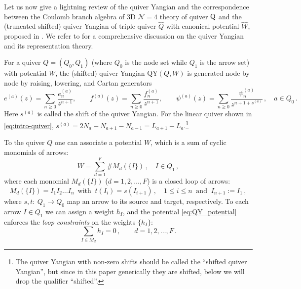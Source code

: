 \documentclass[12pt,a4paper]{article}
\begin{document}
Let us now give a lightning review of the quiver Yangian  and the correspondence between the Coulomb branch algebra of 3D $\mathcal N=4$ theory of quiver $\rm Q$ and the (truncated shifted) quiver Yangian of triple quiver $\hat Q$ with canonical potential $\hat W$, proposed in \cite{ChenLi2026}. We refer to \cite{LiYamazaki2020,Li2024} for a comprehensive discussion on the quiver Yangian and its representation theory.

For a quiver $Q=(Q_0,Q_1)$ (where $Q_0$ is the node set while $Q_1$ is the arrow set) with potential $W$, the (shifted) quiver Yangian QY$(Q,W)$ is generated node by node by
raising, lowering, and Cartan generators
\begin{equation}
 e^{(a)}(z)=\sum_{n\geq0}\frac{e_n^{(a)}}{z^{n+1}},
 \qquad
 f^{(a)}(z)=\sum_{n\geq0}\frac{f_n^{(a)}}{z^{n+1}},
 \qquad
 \psi^{(a)}(z)=\sum_{n\geq 0}\frac{\psi_n^{(a)}}{z^{n+1+s^{(a)}}}\,,\quad a\in Q_0\,.
 \label{eq:qy-mode-expansion}
\end{equation}
Here $s^{(a)}$ is called the shift of the quiver Yangian. For the linear quiver shown in \eqref{eq:intro-quiver}, $s^{(a)}=2N_{a}-N_{a+1}-N_{a-1}=L_{a+1}-L_a$.\footnote{The quiver Yangian with non-zero shifts should be called the ``shifted quiver Yangian”, but since
in this paper generically they are shifted, below we will drop the qualifier ``shifted”.}

To the quiver $Q$ one can associate a potential $W$, which is a sum of cyclic monomials of arrows: 
\begin{equation}\label{eq:QY_potential}
	W=\sum_{d=1}^{F}\# M_d(\{I\})\,,\quad I\in Q_1\,,
\end{equation}
where each monomial $M_d(\{I\})$ ($d=1,2,\dots,F$) is a closed loop of arrows:
\begin{equation}
	M_d(\{I\})=I_1I_2\dots I_n\,\text{ with }\ t(I_i)=s(I_{i+1})\,,  \quad 1\leq i\leq n \ \text{ and }\ I_{n+1}:=I_1\,, 
\end{equation}
where $s,t:\: Q_1\to Q_0$ map an arrow to its source and target, respectively.
To each arrow $I\in Q_1$ we can assign a weight $h_I$, and the potential \eqref{eq:QY_potential} enforces the \textit{loop constraints} on the weights $\{h_I\}$:
\begin{equation}\label{eq:loop_cons}
	\sum_{I\in M_d}h_I=0\,,\qquad d=1,2,\dots,F\,.
\end{equation}
\end{document}
